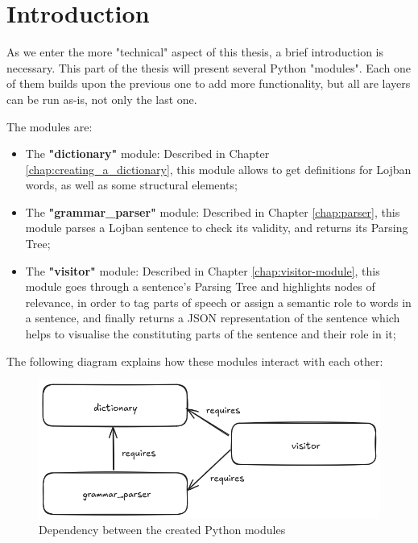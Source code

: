 \chapter{Introduction}

\vspace{0.5cm}

As we enter the more "technical" aspect of this thesis, a brief introduction is necessary. This part of the thesis
will present several Python "modules". Each one of them builds upon the previous one to
add more functionality, but all are layers can be run as-is, not only the last one.\newline

The modules are:

\begin{itemize}
\item The \textbf{"dictionary"} module: Described in Chapter \ref{chap:creating_a_dictionary},
this module allows to get definitions for Lojban words, as well as some structural elements;
\item The \textbf{"grammar\_parser"} module: Described in Chapter \ref{chap:parser}, this module parses
a Lojban sentence to check its validity, and returns its Parsing Tree;
\item The \textbf{"visitor"} module: Described in Chapter \ref{chap:visitor-module}, this module goes through
a sentence's Parsing Tree and highlights nodes of relevance, in order to tag parts of speech or assign a semantic role
to words in a sentence, and finally returns a JSON representation of the sentence which helps to visualise
the constituting parts of the sentence and their role in it;
\end{itemize}

The following diagram explains how these modules interact with each other:\newline

\begin{figure}[H]
\centering
\includegraphics[scale=0.43]{images/module_dependency.png}
\caption{Dependency between the created Python modules}
\end{figure}

